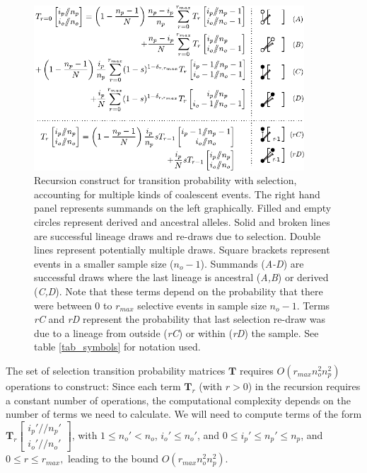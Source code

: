 \documentclass[review]{elsarticle}
\newcommand{\dslash}{/\!\!/}
\newcommand{\Coalc}[4]{\begin{bmatrix}#1\dslash #2 \\ #3\dslash #4 \end{bmatrix}}
\begin{document}
\begin{figure}
  \centering
  \includegraphics[width=0.9\textwidth]{fig/recurrence-selection-dynamic-failures-annotated.pdf}

  \caption{Recursion construct for transition probability with selection, accounting for multiple
    kinds of coalescent events. The right hand panel represents summands on the left graphically.
    Filled and empty circles represent derived and ancestral alleles. Solid and broken lines are
    successful lineage draws and re-draws due to selection. Double lines represent potentially
    multiple draws. Square brackets represent events in a smaller sample size ($n_o-1$). Summands
    (\textit{A-D}) are successful draws where the last lineage is ancestral (\textit{A,B}) or
    derived (\textit{C,D}). Note that these terms depend on the probability that there were between
    $0$ to $r_{max}$ selective events in sample size $n_o-1$. Terms \textit{rC} and \textit{rD}
    represent the probability that last selection re-draw was due to a lineage from outside
    (\textit{rC}) or within (\textit{rD}) the sample. See table \ref{tab_symbols} for notation used.
  }

  \label{fig_rec_selection_dynamic_fail}
\end{figure}
 
The set of selection transition probability matrices $\mathbf{T}$ requires $O(r_{max}n_o^2 n_p^2)$
operations to construct: Since each term $\mathbf{T}_{r}$ (with $r>0$)  in the recursion requires a constant number of operations, 
the computational complexity depends on the number of terms we need to calculate. We will need to compute terms of the form 
 $\mathbf{T}_{r}\Coalc{i_p'}{n_p'}{i_o'}{n_o'}$, with $1 \leq n_o'<n_o$, $i_o' \leq n_o'$, and $0\leq i_p' \leq n_p' \leq n_p$, 
 and $0\leq r \leq r_{max},$ leading to the bound $O(r_{max}n_o^2 n_p^2).$  
 
\end{document}
